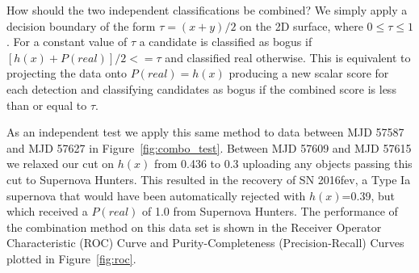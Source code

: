 \documentclass[a4paper,fleqn,usenatbib]{mnras}
\begin{document}


How should the two independent classifications be combined?  We simply apply a decision boundary of the form $\tau = (x + y)/2$ on the 2D surface, where $0\leq\tau\leq1$.  For a constant value of $\tau$ a candidate is classified as bogus if $[h(x)+P(real)]/2 <= \tau$ and classified real otherwise.  This is equivalent to projecting the data onto $P(real)=h(x)$ producing a new scalar score for each detection and classifying candidates as bogus if the combined score is less than or equal to $\tau$.  

As an independent test we apply this same method to data between MJD 57587 and MJD 57627 in
Figure~\ref{fig:combo_test}.  Between MJD 57609 and MJD 57615 we relaxed our cut on $h(x)$ from 0.436 to 0.3 uploading any objects passing this cut to Supernova Hunters.  This resulted in the recovery of SN 2016fev, a Type Ia supernova that would have been automatically rejected with $h(x)$=0.39, but which received a $P(real)$ of 1.0 from Supernova Hunters.  
The performance of the combination method on this data set is shown in the Receiver Operator Characteristic (ROC) Curve and Purity-Completeness (Precision-Recall) Curves plotted in Figure~\ref{fig:roc}.

\end{document}
